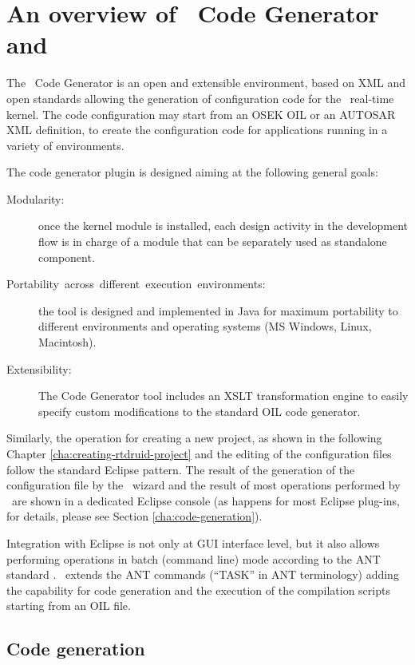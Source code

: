 \chapter{An overview of \rtd\ Code Generator and \ee}
\label{cha:overview}

The \rtd\ Code Generator is an open and extensible environment, based
on XML and open standards allowing the generation of configuration
code for the \ee\ real-time kernel. The code configuration may start
from an OSEK OIL or an AUTOSAR XML definition, to create the
configuration code for applications running in a variety of
environments.

The code generator plugin is designed aiming at the following general
goals:

\begin{description}
\item [Modularity:] once the kernel module is installed, each design
  activity in the development flow is in charge of a module that can
  be separately used as standalone component.
\item [Portability~across~different~execution~environments:] the tool
  is designed and implemented in Java for maximum portability to
  different environments and operating systems (MS Windows, Linux,
  Macintosh).
\item [Extensibility:] The Code Generator tool includes an XSLT
  transformation engine to easily specify custom modifications to the
  standard OIL code generator.
\end{description}

Similarly, the operation for creating a new project, as shown in the
following Chapter \ref{cha:creating-rtdruid-project} and the editing
of the configuration files follow the standard Eclipse pattern. The
result of the generation of the configuration file by the \rtd\ wizard
and the result of most operations performed by \rtd\ are shown in a
dedicated Eclipse console (as happens for most Eclipse plug-ins, for
details, please see Section \ref{cha:code-generation}).

Integration with Eclipse is not only at GUI interface level, but it
also allows performing operations in batch (command line) mode
according to the ANT standard \cite{ANT}. \rtd\ extends the ANT
commands (``TASK'' in ANT terminology) adding the capability for code
generation and the execution of the compilation scripts starting from
an OIL file.


\section{Code generation}

